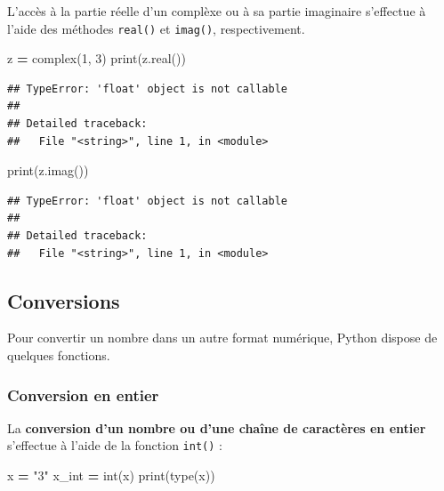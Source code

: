 \documentclass[12pt,]{book}
\newenvironment{Shaded}{\begin{snugshade}}{\end{snugshade}}
\newcommand{\DecValTok}[1]{\textcolor[rgb]{0.00,0.00,0.81}{#1}}
\newcommand{\StringTok}[1]{\textcolor[rgb]{0.31,0.60,0.02}{#1}}
\newcommand{\OperatorTok}[1]{\textcolor[rgb]{0.81,0.36,0.00}{\textbf{#1}}}
\newcommand{\BuiltInTok}[1]{#1}
\newcommand{\NormalTok}[1]{#1}
\numberwithin{equation}{section}
\numberwithin{countremarque}{section}
\begin{document}
L'accès à la partie réelle d'un complèxe ou à sa partie imaginaire
s'effectue à l'aide des méthodes \texttt{real()} et \texttt{imag()},
respectivement.

\begin{Shaded}
\begin{Highlighting}[]
\NormalTok{z }\OperatorTok{=} \BuiltInTok{complex}\NormalTok{(}\DecValTok{1}\NormalTok{, }\DecValTok{3}\NormalTok{)}
\BuiltInTok{print}\NormalTok{(z.real())}
\end{Highlighting}
\end{Shaded}

\begin{lstlisting}
## TypeError: 'float' object is not callable
## 
## Detailed traceback: 
##   File "<string>", line 1, in <module>
\end{lstlisting}

\begin{Shaded}
\begin{Highlighting}[]
\BuiltInTok{print}\NormalTok{(z.imag())}
\end{Highlighting}
\end{Shaded}

\begin{lstlisting}
## TypeError: 'float' object is not callable
## 
## Detailed traceback: 
##   File "<string>", line 1, in <module>
\end{lstlisting}

\subsection{Conversions}\label{conversions}

Pour convertir un nombre dans un autre format numérique, Python dispose
de quelques fonctions.

\subsubsection{Conversion en entier}\label{conversion-en-entier}

La \textbf{conversion d'un nombre ou d'une chaîne de caractères en
entier} s'effectue à l'aide de la fonction \texttt{int()} :

\begin{Shaded}
\begin{Highlighting}[]
\NormalTok{x }\OperatorTok{=} \StringTok{"3"}
\NormalTok{x_int }\OperatorTok{=} \BuiltInTok{int}\NormalTok{(x)}
\BuiltInTok{print}\NormalTok{(}\BuiltInTok{type}\NormalTok{(x))}
\end{Highlighting}
\end{Shaded}
\end{document}
